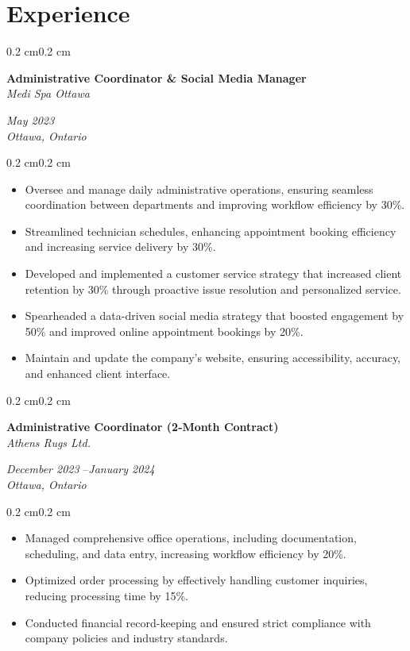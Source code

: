 \documentclass[10pt, letterpaper]{article}
\newenvironment{highlights}{%
    \begin{itemize}[
        topsep=0.10 cm,%
        parsep=0.10 cm,%
        partopsep=0pt,%
        itemsep=0pt,%
        leftmargin=0.4 cm + 10pt%
    ]
}{%
    \end{itemize}%
}
\newenvironment{onecolentry}{%
    \begin{adjustwidth}{0.2 cm}{0.2 cm}%
}{%
    \end{adjustwidth}%
}
\newenvironment{twocolentry}[1]{%
    \begin{onecolentry}%
    \def\twocolentryarg{#1}%
    \noindent
    \begin{minipage}[t]{0.68\textwidth} %
}{%
    \end{minipage}\hfill%
    \begin{minipage}[t]{0.30\textwidth} %
      \raggedleft\twocolentryarg
    \end{minipage}%
    \vspace{0.2cm}%
    \end{onecolentry}%
}
\begin{document}
\section{Experience}
\begin{twocolentry}{%
\textit{May 2023 }\textit{} \\[0.1cm]
\textit{Ottawa, Ontario}%
}
    \textbf{Administrative Coordinator \& Social Media Manager }\\
    \textit{Medi Spa Ottawa }
\end{twocolentry}
\vspace{0.10 cm}
\begin{onecolentry}
    \begin{highlights}
        \item Oversee and manage daily administrative operations, ensuring seamless coordination between departments and improving workflow efficiency by 30\%.
        \item Streamlined technician schedules, enhancing appointment booking efficiency and increasing service delivery by 30\%.
        \item Developed and implemented a customer service strategy that increased client retention by 30\% through proactive issue resolution and personalized service.
        \item Spearheaded a data-driven social media strategy that boosted engagement by 50\% and improved online appointment bookings by 20\%.
        \item Maintain and update the company’s website, ensuring accessibility, accuracy, and enhanced client interface.
    \end{highlights}
\end{onecolentry}
\vspace{0.2 cm}
\begin{twocolentry}{%
\textit{December 2023 }--\textit{January 2024} \\[0.1cm]
\textit{Ottawa, Ontario}%
}
    \textbf{Administrative Coordinator (2-Month Contract) }\\
    \textit{Athens Rugs Ltd. }
\end{twocolentry}
\vspace{0.10 cm}
\begin{onecolentry}
    \begin{highlights}
        \item Managed comprehensive office operations, including documentation, scheduling, and data entry, increasing workflow efficiency by 20\%.
        \item Optimized order processing by effectively handling customer inquiries, reducing processing time by 15\%.
        \item Conducted financial record-keeping and ensured strict compliance with company policies and industry standards.
    \end{highlights}
\end{onecolentry}
\end{document}
